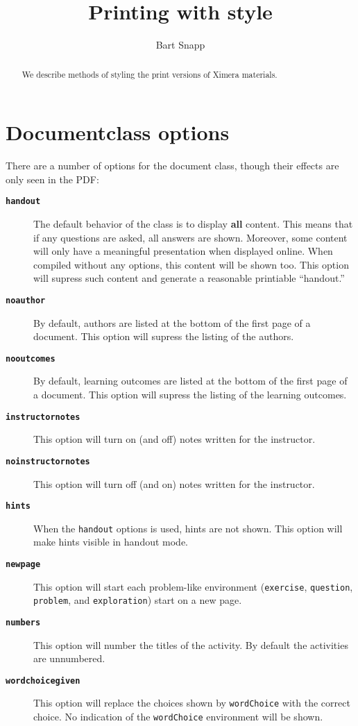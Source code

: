 \documentclass{ximera}
\title{Printing with style}
\author{Bart Snapp}
\begin{document}
\begin{abstract}
We describe methods of styling the print versions of Ximera materials.
\end{abstract}
\maketitle
 


\section{Documentclass options}

There are a number of options for the document class, though their
effects are only seen in the PDF:
 
\begin{description}
\item[\tt\bfseries handout] The default behavior of the class is to display \textbf{all} content. This means that if any questions are asked, all answers are shown. Moreover, some content will only have a meaningful presentation when displayed online. When compiled without any options, this content will be shown too. This option will supress such content and generate a reasonable printiable ``handout.''
\item[\tt\bfseries noauthor] By default, authors are listed at the bottom of the first page of a document. This option will supress the listing of the authors.
\item[\tt\bfseries nooutcomes] By default, learning outcomes are listed at the bottom of the first page of a document. This option will supress the listing of the learning outcomes.
\item[\tt\bfseries instructornotes] This option will turn on (and off) notes written for the instructor.
\item[\tt\bfseries noinstructornotes] This option will turn off (and on) notes written for the instructor.
\item[\tt\bfseries hints] When the \texttt{handout} options is used, hints are not shown. This option will make hints visible in handout mode.
\item[\tt\bfseries newpage] This option will start each problem-like environment (\texttt{exercise}, \texttt{question}, \texttt{problem}, and \texttt{exploration}) start on a new page.
\item[\tt\bfseries numbers] This option will number the titles of the activity. By default the activities are unnumbered.
\item[\tt\bfseries wordchoicegiven] This option will replace the choices shown by \texttt{wordChoice} with the correct choice. No indication of the \texttt{wordChoice} environment will be shown.
\end{description}
\end{document}
